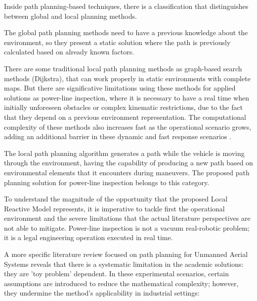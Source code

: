 \documentclass[a4paper, 11pt]{article}
\newcommand\C[1]\null
\begin{document}
 Inside path planning-based techniques, there is a classification that distinguishes between global and local planning methods. 
 
 The global path planning methods need to have a previous knowledge about the environment, so they present a static solution where the path is previously calculated based on already known factors. 

There are some traditional local path planning methods as graph-based search methods (Dijkstra), that can work properly in static environments with complete maps. But there are significative limitations using these methods for applied solutions as power-line inspection, where it is necessary to have a real time when initially unforeseen obstacles or complex kinematic restrictions, due to the fact that they depend on a previous environment representation. The computational complexity of these methods also increases fast as the operational scenario grows, adding an additional barrier in these dynamic and fast response scenarios \cite{debnath2024review} \cite{meng2025advances}. 

 The local path planning algorithm generates a path while the vehicle is moving through the environment, having the capability of producing a new path based on environmental elements that it encounters during maneuvers. The proposed path planning solution for power-line inspection belongs to this category.
 
 To understand the magnitude of the opportunity that the proposed Local Reactive Model represents, it is imperative to tackle first the operational environment and the severe limitations that the actual literature perspectives are not able to mitigate. Power-line inspection is not a vacuum real-robotic problem; it is a legal engineering operation executed in real time. 

A more specific literature review focused on path planning for Unmanned Aerial Systems \C{referencia Xabi [1]} reveals that there is a systematic limitation in the academic solutions: they are 'toy problem' dependent. In these experimental scenarios, certain assumptions are introduced to reduce the mathematical complexity; however, they undermine the method's applicability in industrial settings: 
\end{document}

